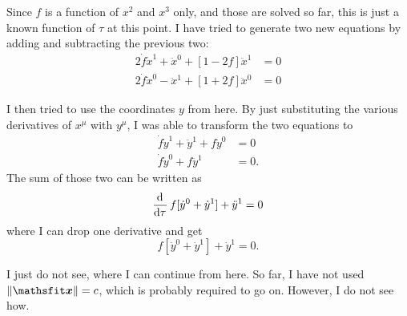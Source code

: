 Since $f$ is a function of $x^2$ and $x^3$ only, and those are solved so far,
this is just a known function of $\tau$ at this point. I have tried to generate
two new equations by adding and subtracting the previous two:
\begin{align*}
    2 \dot f \dot x^1 + \ddot x^0 + [1 - 2f] \ddot x^1 &= 0 \\
    2 \dot f \dot x^0 - \ddot x^1 + [1 + 2f] \ddot x^0 &= 0
\end{align*}

I then tried to use the coordinates $y$ from here. By just substituting the
various derivatives of $x^\mu$ with $y^\mu$, I was able to transform the two
equations to
\begin{align*}
    \dot f \dot y^1 + \ddot y^1 + f \ddot y^0 &= 0 \\
    \dot f \dot y^0 + f \ddot y^1 &= 0.
\end{align*}
The sum of those two can be written as
\[
    \dod{}\tau f [\dot y^0 + \dot y^1] + \ddot y^1 = 0
\]
where I can drop one derivative and get
\[
    f [\dot y^0 + \dot y^1] + \dot y^1 = 0.
\]

I just do not see, where I can continue from here. So far, I have not used $\|
\tens x \| = c$, which is probably required to go on. However, I do not see
how.

\IfFileExists{\bibliographyfile}{
    \printbibliography
}{}



